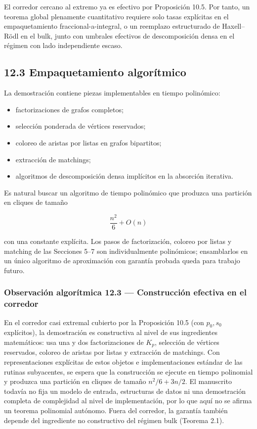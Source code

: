\documentclass[
  spanish,
  11pt,
  a4paper,
]{article}
\providecommand{\tightlist}{%
  \setlength{\itemsep}{0pt}\setlength{\parskip}{0pt}}
\begin{document}
El corredor cercano al extremo ya es efectivo por Proposición 10.5. Por tanto, un teorema global plenamente cuantitativo requiere solo tasas explícitas en el empaquetamiento fraccional-a-integral, o un reemplazo estructurado de Haxell--Rödl en el bulk, junto con umbrales efectivos de descomposición densa en el régimen con lado independiente escaso.

\subsection{12.3 Empaquetamiento algorítmico}\label{empaquetamiento-algoruxedtmico}

La demostración contiene piezas implementables en tiempo polinómico:

\begin{itemize}
\tightlist
\item
  factorizaciones de grafos completos;
\item
  selección ponderada de vértices reservados;
\item
  coloreo de aristas por listas en grafos bipartitos;
\item
  extracción de matchings;
\item
  algoritmos de descomposición densa implícitos en la absorción iterativa.
\end{itemize}

Es natural buscar un algoritmo de tiempo polinómico que produzca una partición en cliques de tamaño

\[
\frac{n^2}{6}+O(n)
\]

con una constante explícita. Los pasos de factorización, coloreo por listas y matching de las Secciones 5--7 son individualmente polinómicos; ensamblarlos en un único algoritmo de aproximación con garantía probada queda para trabajo futuro.

\subsubsection{Observación algorítmica 12.3 --- Construcción efectiva en el corredor}\label{observaciuxf3n-algoruxedtmica-12.3-construcciuxf3n-efectiva-en-el-corredor}

En el corredor casi extremal cubierto por la Proposición 10.5 (con \(p_0,s_0\) explícitos), la demostración es constructiva al nivel de sus ingredientes matemáticos: usa una y dos factorizaciones de \(K_p\), selección de vértices reservados, coloreo de aristas por listas y extracción de matchings. Con representaciones explícitas de estos objetos e implementaciones estándar de las rutinas subyacentes, se espera que la construcción se ejecute en tiempo polinomial y produzca una partición en cliques de tamaño \(n^2/6+3n/2\). El manuscrito todavía no fija un modelo de entrada, estructuras de datos ni una demostración completa de complejidad al nivel de implementación, por lo que aquí no se afirma un teorema polinomial autónomo. Fuera del corredor, la garantía también depende del ingrediente no constructivo del régimen bulk (Teorema 2.1).
\end{document}
